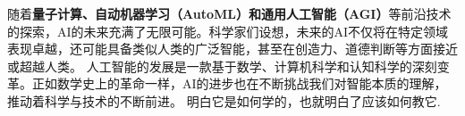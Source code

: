 %
%
%
%
%
随着{\bf 量子计算、自动机器学习（AutoML）和通用人工智能（AGI）}等前沿技术的探索，AI的未来充满了无限可能。科学家们设想，未来的AI不仅将在特定领域表现卓越，还可能具备类似人类的广泛智能，甚至在创造力、道德判断等方面接近或超越人类。
人工智能的发展是一款基于数学、计算机科学和认知科学的深刻变革。正如数学史上的革命一样，AI的进步也在不断挑战我们对智能本质的理解，推动着科学与技术的不断前进。
明白它是如何学的，也就明白了应该如何教它.
